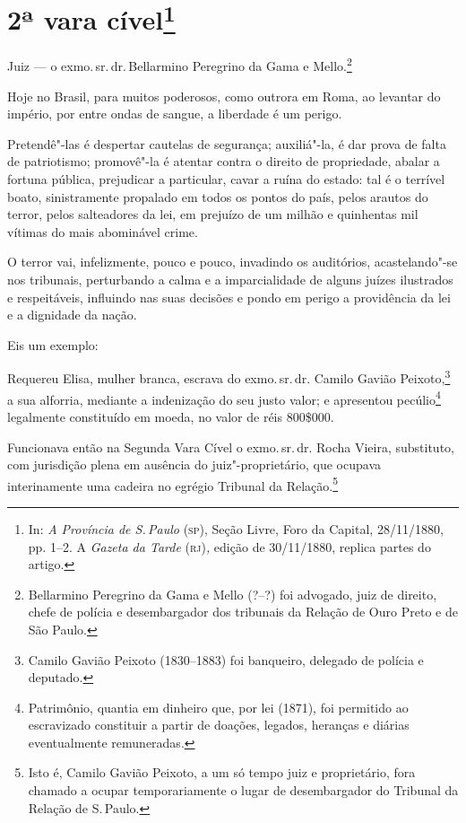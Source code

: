 \chapter{2ª vara cível\footnote[*]{In: \emph{A Província de S.\,Paulo}
  (\textsc{sp}), Seção Livre, Foro da Capital, 28/11/1880, pp. 1--2. A
  \emph{Gazeta da Tarde} (\textsc{rj})\emph{,} edição de 30/11/1880, replica
  partes do artigo.}}


Juiz --- o exmo.\,sr.\,dr.\,Bellarmino Peregrino da Gama e
Mello.\footnote{Bellarmino Peregrino da Gama e Mello (?--?) foi
  advogado, juiz de direito, chefe de polícia e desembargador dos
  tribunais da Relação de Ouro Preto e de São Paulo.}\smallskip

Hoje no Brasil, para muitos poderosos, como outrora em Roma, ao levantar
do império, por entre ondas de sangue, a liberdade é um perigo.

Pretendê"-las é despertar cautelas de segurança; auxiliá"-la, é dar prova
de falta de patriotismo; promovê"-la é atentar contra o direito de
propriedade, abalar a fortuna pública, prejudicar a particular, cavar a
ruína do estado: tal é o terrível boato, sinistramente propalado em
todos os pontos do país, pelos arautos do terror, pelos salteadores da
lei, em prejuízo de um milhão e quinhentas mil vítimas do mais
abominável crime.

O terror vai, infelizmente, pouco e pouco, invadindo os auditórios,
acastelando"-se nos tribunais, perturbando a calma e a imparcialidade de
alguns juízes ilustrados e respeitáveis, influindo nas suas decisões e
pondo em perigo a providência da lei e a dignidade da nação.

Eis um exemplo:

Requereu Elisa, mulher branca, escrava do exmo.\,sr.\,dr. Camilo Gavião
Peixoto,\footnote{Camilo Gavião Peixoto (1830--1883) foi banqueiro,
  delegado de polícia e deputado.} a sua alforria, mediante a
indenização do seu justo valor; e apresentou pecúlio\footnote{
  Patrimônio, quantia em dinheiro que, por lei (1871), foi permitido ao
  escravizado constituir a partir de doações, legados, heranças e
  diárias eventualmente remuneradas.} legalmente constituído em moeda,
no valor de réis 800\$000.

Funcionava então na Segunda Vara Cível o exmo.\,sr.\,dr. Rocha Vieira,
substituto, com jurisdição plena em ausência do juiz"-proprietário, que
ocupava interinamente uma cadeira no egrégio Tribunal da
Relação.\footnote{Isto é, Camilo Gavião Peixoto, a um só tempo juiz e
  proprietário, fora chamado a ocupar temporariamente o lugar de
  desembargador do Tribunal da Relação de S.\,Paulo.}

